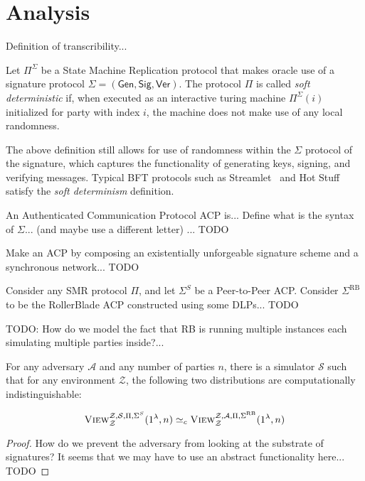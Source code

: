 \section{Analysis}

\begin{definition}[Transcribability]
      Definition of transcribility...
\end{definition}

\begin{definition}
      Let $\Pi^\Sigma$ be a State Machine Replication protocol that makes
      oracle use of a signature protocol $\Sigma = (\textsf{Gen}, \textsf{Sig}, \textsf{Ver})$.
      The protocol $\Pi$ is called \emph{soft deterministic} if,
      when executed as an interactive turing machine $\Pi^\Sigma(i)$ initialized for party
      with index $i$, the machine does not make use of any local randomness.
\end{definition}

The above definition still allows for use of randomness within the $\Sigma$ protocol of the
signature, which captures the functionality of generating keys, signing, and verifying
messages. Typical BFT protocols such as Streamlet~\cite{streamlet} and Hot Stuff~\cite{hotstuff}
satisfy the \emph{soft determinism} definition.

\begin{definition}
      An Authenticated Communication Protocol ACP is...
      Define what is the syntax of $\Sigma$... (and maybe use a different letter)
      ... TODO
\end{definition}

\begin{definition}
      Make an ACP by composing an existentially unforgeable signature scheme and
      a synchronous network... TODO
\end{definition}

\begin{conjecture}[Similarity]
      Consider any SMR protocol $\Pi$, and let $\Sigma^S$ be a
      Peer-to-Peer ACP. Consider $\Sigma^\mathrm{RB}$ to be the RollerBlade
      ACP constructed using some DLPs... TODO

      TODO: How do we model the fact that RB is running multiple instances
      each simulating multiple parties inside?...

      For any adversary $\mathcal{A}$ and any number of parties $n$,
      there is a simulator $\mathcal{S}$ such that
      for any environment $\mathcal{Z}$,
      the following two distributions
      are computationally indistinguishable:

      \[
            \textsc{View}^{\mathcal{Z},\mathcal{S},\Pi,\Sigma^S}_{\mathcal{Z}}(1^\lambda, n)
            \simeq_c
            \textsc{View}^{\mathcal{Z},\mathcal{A},\Pi,\Sigma^\mathrm{RB}}_{\mathcal{Z}}(1^\lambda, n)
      \]
\end{conjecture}
\begin{proof}
      How do we prevent the adversary from looking at the substrate of signatures?
      It seems that we may have to use an abstract functionality here... TODO
\end{proof}

